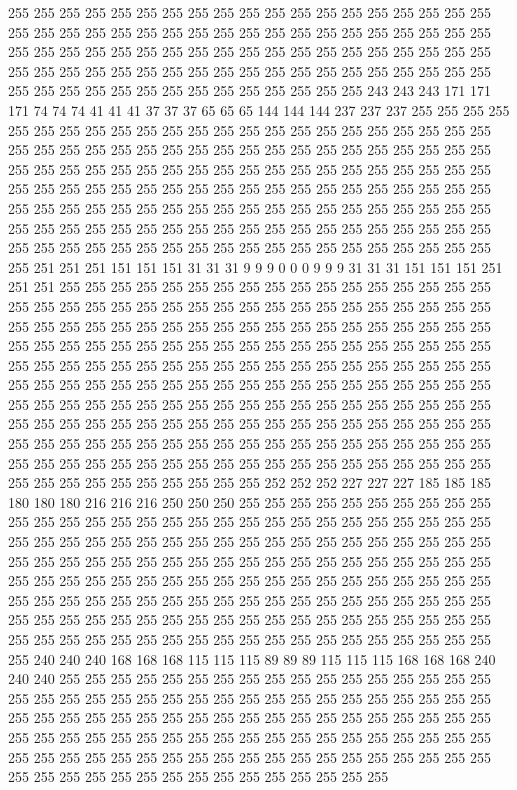 255 255 255 255 255 255 255 255 255 255 255 255 255 255 255 255 255 255 255 255 255 255 255 255 255 255 255 255 255 255 255 255 255 255 255 255 255 255 255 255 255 255 255 255 255 255 255 255 255 255 255 255 255 255 255 255 255 255 255 255 255 255 255 255 255 255 255 255 255 255 255 255 255 255 255 255 255 255 255 255 255 255 255 255 255 255 255 255 255 255 243 243 243 171 171 171 74 74 74 41 41 41 37 37 37 65 65 65 144 144 144 237 237 237 255 255 255 255 255 255 255 255 255 255 255 255 255 255 
255 255 255 255 255 255 255 255 255 255 255 255 255 255 255 255 255 255 255 255 255 255 255 255 255 255 255 255 255 255 255 255 255 255 255 255 255 255 255 255 255 255 255 255 255 255 255 255 255 255 255 255 255 255 255 255 255 255 255 255 255 255 255 255 255 255 255 255 255 255 255 255 255 255 255 255 255 255 255 255 255 255 255 255 255 255 255 255 255 255 255 255 255 255 255 255 255 255 255 255 255 255 255 255 255 255 255 255 255 255 255 255 255 255 255 255 255 255 255 255 255 255 255 255 251 251 251 151 
151 151 31 31 31 9 9 9 0 0 0 9 9 9 31 31 31 151 151 151 251 251 251 255 255 255 255 255 255 255 255 255 255 255 255 255 255 255 255 255 255 255 255 255 255 255 255 255 255 255 255 255 255 255 255 255 255 255 255 255 255 255 255 255 255 255 255 255 255 255 255 255 255 255 255 255 255 255 255 255 255 255 255 255 255 255 255 255 255 255 255 255 255 255 255 255 255 255 255 255 255 255 255 255 255 255 255 255 255 255 255 255 255 255 255 255 255 255 255 255 255 255 255 255 255 255 255 255 
255 255 255 255 255 255 255 255 255 255 255 255 255 255 255 255 255 255 255 255 255 255 255 255 255 255 255 255 255 255 255 255 255 255 255 255 255 255 255 255 255 255 255 255 255 255 255 255 255 255 255 255 255 255 255 255 255 255 255 255 255 255 255 255 255 255 255 255 255 255 255 255 255 255 255 255 255 255 255 255 255 255 255 255 255 255 255 255 255 255 255 255 255 252 252 252 227 227 227 185 185 185 180 180 180 216 216 216 250 250 250 255 255 255 255 255 255 255 255 255 255 255 255 255 255 255 255 255 
255 255 255 255 255 255 255 255 255 255 255 255 255 255 255 255 255 255 255 255 255 255 255 255 255 255 255 255 255 255 255 255 255 255 255 255 255 255 255 255 255 255 255 255 255 255 255 255 255 255 255 255 255 255 255 255 255 255 255 255 255 255 255 255 255 255 255 255 255 255 255 255 255 255 255 255 255 255 255 255 255 255 255 255 255 255 255 255 255 255 255 255 255 255 255 255 255 255 255 255 255 255 255 255 255 255 255 255 255 255 255 255 255 255 255 255 255 255 255 255 255 255 255 255 255 255 255 240 
240 240 168 168 168 115 115 115 89 89 89 115 115 115 168 168 168 240 240 240 255 255 255 255 255 255 255 255 255 255 255 255 255 255 255 255 255 255 255 255 255 255 255 255 255 255 255 255 255 255 255 255 255 255 255 255 255 255 255 255 255 255 255 255 255 255 255 255 255 255 255 255 255 255 255 255 255 255 255 255 255 255 255 255 255 255 255 255 255 255 255 255 255 255 255 255 255 255 255 255 255 255 255 255 255 255 255 255 255 255 255 255 255 255 255 255 255 255 255 255 255 255 255 255 255 255 255 255 
